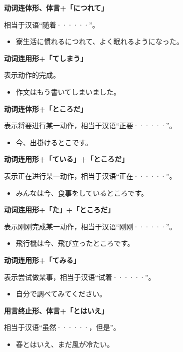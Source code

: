 {\bf
\noindent 动词连体形、体言+「につれて」
}

相当于汉语``随着······''。
\begin{itemize}
  \item 寮生活に慣れるにつれて、よく眠れるようになった。
\end{itemize}

{\bf
\noindent 动词连用形+「てしまう」
}

表示动作的完成。
\begin{itemize}
  \item 作文はもう書いてしまいました。
\end{itemize}

{\bf
\noindent 动词连体形+「ところだ」
}

表示将要进行某一动作，相当于汉语``正要······''。
\begin{itemize}
  \item 今、出掛けるとこです。
\end{itemize}

{\bf
\noindent 动词连用形+「ている」+「ところだ」
}

表示正在进行某一动作，相当于汉语``正在······''。
\begin{itemize}
  \item みんなは今、食事をしているところです。
\end{itemize}

{\bf
\noindent 动词连用形+「た」+「ところだ」
}

表示刚刚完成某一动作，相当于汉语``刚刚······''。
\begin{itemize}
  \item 飛行機は今、飛び立ったところです。
\end{itemize}

{\bf
\noindent 动词连用形+「てみる」
}

表示尝试做某事，相当于汉语``试着······''。
\begin{itemize}
  \item 自分で調べてみてください。
\end{itemize}

{\bf
\noindent 用言终止形、体言+「とはいえ」
}

相当于汉语``虽然······，但是''。
\begin{itemize}
  \item 春とはいえ、まだ風が冷たい。
\end{itemize}

